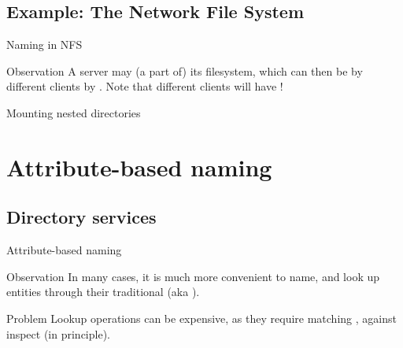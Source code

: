 \subsection{Example: The Network File System}
\begin{slide}{Naming in NFS}
  \begin{centerfig}
  \end{centerfig}
  \begin{block}{Observation}
    A server may  (a part of) its filesystem, which can then be  by different
    clients by . Note that different clients will have !
  \end{block}
\end{slide}
\begin{slide}{Mounting nested directories}
  \begin{centerfig}
  \end{centerfig}
\end{slide}
\section{Attribute-based naming}
\subsection{Directory services}
\begin{slide}{Attribute-based naming}
  \begin{block}{Observation} 
    In many cases, it is much more convenient to name, and look up entities through their
     \mathexpr{\Rightarrow} traditional  (aka ).
  \end{block}
  \begin{alertblock}{Problem} 
    Lookup operations can be expensive, as they require matching ,
    against  \mathexpr{\Rightarrow} inspect  (in principle).
  \end{alertblock}
\end{slide}
